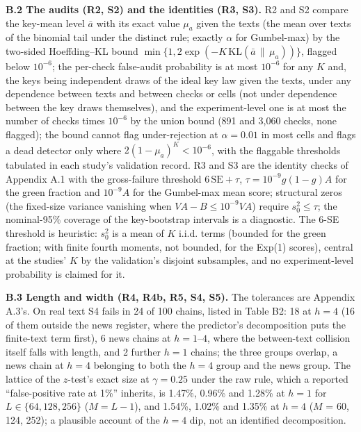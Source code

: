 \documentclass[11pt,letterpaper]{article}
\begin{document}
\textbf{B.2 The audits (R2, S2) and the identities (R3, S3).} R2 and S2 compare the key-mean level \(\bar a\) with its exact value \(\mu_a\) given the texts (the mean over texts of the binomial tail under the distinct rule; exactly \(\alpha\) for Gumbel-max) by the two-sided Hoeffding--KL bound \(\min\{1, 2\exp(-K\,\mathrm{KL}(\bar a \,\|\, \mu_a))\}\), flagged below \(10^{-6}\); the per-check false-audit probability is at most \(10^{-6}\) for any \(K\) and, the keys being independent draws of the ideal key law given the texts, under any dependence between texts and between checks or cells (not under dependence between the key draws themselves), and the experiment-level one is at most the number of checks times \(10^{-6}\) by the union bound (891 and 3,060 checks, none flagged); the bound cannot flag under-rejection at \(\alpha = 0.01\) in most cells and flags a dead detector only where \(2(1 - \mu_a)^K < 10^{-6}\), with the flaggable thresholds tabulated in each study's validation record. R3 and S3 are the identity checks of Appendix A.1 with the gross-failure threshold \(6\,\mathrm{SE} + \tau\), \(\tau = 10^{-9} g(1-g) A\) for the green fraction and \(10^{-9} A\) for the Gumbel-max mean score; structural zeros (the fixed-size variance vanishing when \(V A - B \le 10^{-9} V A\)) require \(s_0^2 \le \tau\); the nominal-95\% coverage of the key-bootstrap intervals is a diagnostic. The 6-SE threshold is heuristic: \(s_0^2\) is a mean of \(K\) i.i.d. terms (bounded for the green fraction; with finite fourth moments, not bounded, for the Exp(1) scores), central at the studies' \(K\) by the validation's disjoint subsamples, and no experiment-level probability is claimed for it.

\textbf{B.3 Length and width (R4, R4b, R5, S4, S5).} The tolerances are Appendix A.3's. On real text S4 fails in 24 of 100 chains, listed in Table B2: 18 at \(h = 4\) (16 of them outside the news register, where the predictor's decomposition puts the finite-text term first), 6 news chains at \(h = 1\)--\(4\), where the between-text collision itself falls with length, and 2 further \(h = 1\) chains; the three groups overlap, a news chain at \(h = 4\) belonging to both the \(h = 4\) group and the news group. The lattice of the \(z\)-test's exact size at \(\gamma = 0.25\) under the raw rule, which a reported ``false-positive rate at 1\%'' inherits, is 1.47\%, 0.96\% and 1.28\% at \(h = 1\) for \(L \in \{64, 128, 256\}\) (\(M = L - 1\)), and 1.54\%, 1.02\% and 1.35\% at \(h = 4\) (\(M\) = 60, 124, 252); a plausible account of the \(h = 4\) dip, not an identified decomposition.
\end{document}
